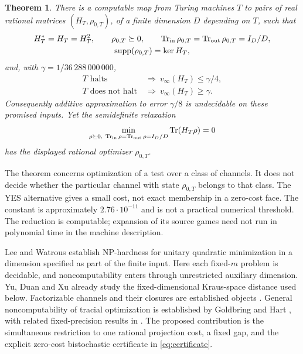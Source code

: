 \documentclass[11pt,a4paper]{article}
\newtheorem{theorem}{Theorem}
\newcommand{\Tr}{\operatorname{Tr}}
\newcommand{\supp}{\operatorname{supp}}
\begin{document}
\begin{theorem}\label{thm:main}
There is a computable map from Turing machines $T$ to pairs of real rational matrices $(H_T,\rho_{0,T})$, of a finite dimension $D$ depending on $T$, such that
\begin{gather}
 H_T^*=H_T=H_T^2,\qquad \rho_{0,T}\succeq0,\qquad
 \Tr_{\rm in}\rho_{0,T}=\Tr_{\rm out}\rho_{0,T}=I_D/D,\\
 \supp(\rho_{0,T})=\ker H_T,                       \label{eq:certificate}
\end{gather}
and, with $\gamma=1/36\,288\,000\,000$,
\begin{align}
 T\text{ halts}&\ \Longrightarrow\ v_\infty(H_T)\le\gamma/4,\\
 T\text{ does not halt}&\ \Longrightarrow\ v_\infty(H_T)\ge\gamma.
\end{align}
Consequently additive approximation to error $\gamma/8$ is undecidable on these promised inputs. Yet the semidefinite relaxation
\begin{equation}
 \min_{\rho\succeq0,\ \Tr_{\rm in}\rho=\Tr_{\rm out}\rho=I_D/D}
       \Tr(H_T\rho)=0                             \label{eq:sdp}
\end{equation}
has the displayed rational optimizer $\rho_{0,T}$.
\end{theorem}

The theorem concerns optimization of a test over a class of channels. It does not decide whether the particular channel with state $\rho_{0,T}$ belongs to that class. The YES alternative gives a small cost, not exact membership in a zero-cost face. The constant is approximately $2.76\cdot10^{-11}$ and is not a practical numerical threshold. The reduction is computable; expansion of its source games need not run in polynomial time in the machine description.

Lee and Watrous \cite{lw} establish NP-hardness for unitary quadratic minimization in a dimension specified as part of the finite input. Here each fixed-$m$ problem is decidable, and noncomputability enters through unrestricted auxiliary dimension. Yu, Duan and Xu \cite[Lemma 2]{ydx} already study the fixed-dimensional Kraus-space distance used below. Factorizable channels and their closures are established objects \cite{hm,mr,musat}. General noncomputability of tracial optimization is established by Goldbring and Hart \cite{gh}, with related fixed-precision results in \cite{cct}. The proposed contribution is the simultaneous restriction to one rational projection cost, a fixed gap, and the explicit zero-cost bistochastic certificate in \eqref{eq:certificate}.
\end{document}
